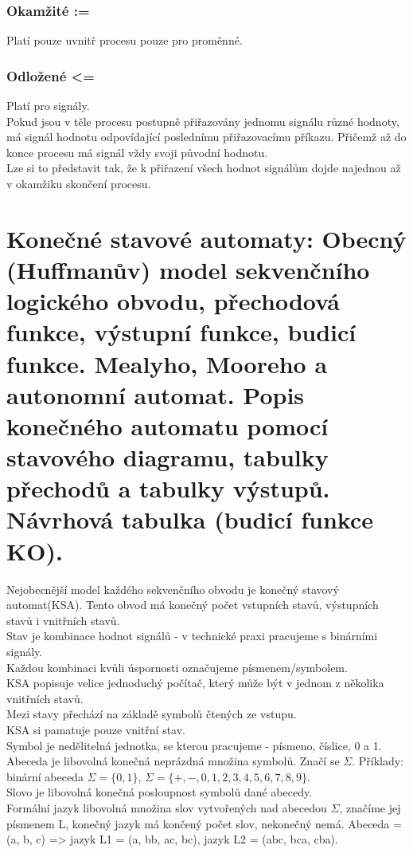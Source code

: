 \subsubsection{Okamžité :=}
Platí pouze uvnitř procesu pouze pro proměnné.\\
\subsubsection{Odložené <= }
Platí pro signály.\\
Pokud jsou v těle procesu postupně přiřazovány jednomu signálu různé hodnoty, má signál hodnotu odpovídající poslednímu přiřazovacímu příkazu. Přičemž až do konce procesu má signál vždy svoji původní hodnotu.\\
Lze si to představit tak, že k přiřazení všech hodnot signálům dojde najednou až v okamžiku skončení procesu.\\

\section{Konečné stavové automaty: Obecný (Huffmanův) model sekvenčního logického obvodu, přechodová funkce, výstupní funkce, budicí funkce. Mealyho, Mooreho a autonomní automat. Popis konečného automatu pomocí stavového diagramu, tabulky přechodů a tabulky výstupů. Návrhová tabulka (budicí funkce KO).}

Nejobecnější model každého sekvenčního obvodu je konečný stavový automat(KSA). Tento obvod má konečný počet vstupních stavů, výstupních stavů i vnitřních stavů. \\
Stav je kombinace hodnot signálů - v technické praxi pracujeme s binárními signály.\\
Každou kombinaci kvůli úspornosti označujeme písmenem/symbolem.\\
KSA popisuje velice jednoduchý počítač, který může být v jednom z několika vnitřních stavů.\\
Mezi stavy přechází na základě symbolů čtených ze vstupu.\\
KSA si pamatuje pouze vnitřní stav.\\
Symbol je nedělitelná jednotka, se kterou pracujeme - písmeno, číslice, 0 a 1.\\
Abeceda je libovolná konečná neprázdná množina symbolů. Značí se \(\Sigma \). Příklady: binární abeceda \(\Sigma = \{0,1\} \), \(\Sigma = \{+,-,0,1,2,3,4,5,6,7,8,9\} \).\\
Slovo je libovolná konečná posloupnost symbolů dané abecedy.\\
Formální jazyk libovolná množina slov vytvořených nad abecedou \(\Sigma \), značíme jej písmenem L, konečný jazyk má končený počet slov, nekonečný nemá. Abeceda = (a, b, c) => jazyk L1 = (a, bb, ac, bc), jazyk L2 = (abc, bca, cba).\\

